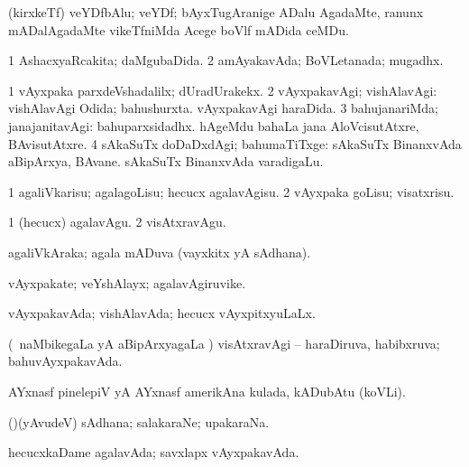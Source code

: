 \bentry
{}
\gl{\nA}
\bmng
(kirxkeTf) veYDfbAlu; veYDf; bAyxTugAranige ADalu AgadaMte, ranunx mADalAgadaMte vikeTfniMda Acege boVlf mADida ceMDu. 
\emng
\eentry

\bentry 
{}
\gl{\gu}
\bmng
\bnum
\num{1} AshacxyaRcakita; daMgubaDida. 
\num{2} amAyakavAda; BoVLetanada; mugadhx. 
\enum
\emng
\eentry

\bentry
{}
\gl{\kirxvi}
\bmng
\bnum
\num{1} vAyxpaka parxdeVshadalilx; dUradUrakekx. 
\num{2} vAyxpakavAgi; vishAlavAgi:  vishAlavAgi Odida; bahushurxta.  vAyxpakavAgi haraDida. 
\num{3} bahujanariMda; janajanitavAgi:  bahuparxsidadhx.  hAgeMdu bahaLa jana AloVcisutAtxre, BAvisutAtxre. 
\num{4} sAkaSuTx doDaDxdAgi; bahumaTiTxge:  sAkaSuTx BinanxvAda aBipArxya, BAvane.  sAkaSuTx BinanxvAda varadigaLu. 
\enum
\emng
\eentry

\bentry
{} 
\gl{\sakirx}
\expl{}
\bmng
\bnum
\num{1} agaliVkarisu; agalagoLisu; hecucx agalavAgisu. 
\num{2} vAyxpaka goLisu; visatxrisu. 
\enum
\emng

\noindent
\gl{\akirx}
\bmng
\bnum
\num{1} (hecucx) agalavAgu. 
\num{2} visAtxravAgu. 
\enum
\emng
\eentry

\bentry
{} 
\gl{\nA}
\expl{}
\bmng
agaliVkAraka; agala mADuva (vayxkitx yA sAdhana). 
\emng
\eentry

\bentry
{}
\gl{\nA}
\bmng
vAyxpakate; veYshAlayx; agalavAgiruvike. 
\emng
\eentry

\bentry
{}
\gl{\gu}
\bmng
vAyxpakavAda; vishAlavAda; hecucx vAyxpitxyuLaLx. 
\emng
\eentry

\bentry
{}
\gl{\gu}
\bmng
(\kanmu\ naMbikegaLa yA aBipArxyagaLa \vi) visAtxravAgi -- haraDiruva, habibxruva; bahuvAyxpakavAda. 
\emng
\eentry

\bentry
{}
\gl{\nA}
\bmng
AYxnasf pinelepiV yA AYxnasf amerikAna kulada, kADubAtu (koVLi). 
\emng
\eentry

\bentry
{}
\gl{\nA}
\bmng
(\AmA)(yAvudeV) sAdhana; salakaraNe; upakaraNa. 
\emng
\eentry

\bentry
{} 
\gl{\gu}
\expl{}
\bmng
hecucxkaDame agalavAda; savxlapx vAyxpakavAda. 
\emng
\eentry

